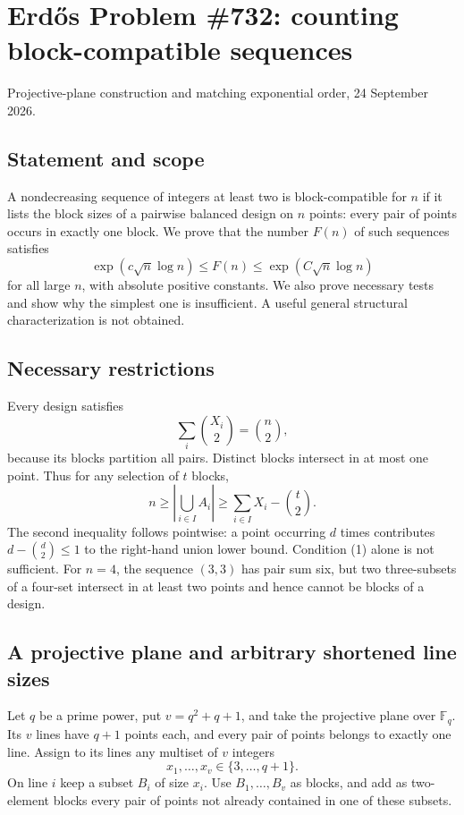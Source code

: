 \section{Erd\H{o}s Problem \#732: counting block-compatible sequences}
\noindent Projective-plane construction and matching exponential order, 24 September 2026.

\subsection*{Statement and scope}
A nondecreasing sequence of integers at least two is block-compatible for $n$ if it lists the block sizes of a pairwise balanced design on $n$ points: every pair of points occurs in exactly one block. We prove that the number $F(n)$ of such sequences satisfies
\[
 \exp(c\sqrt n\log n)\leq F(n)\leq\exp(C\sqrt n\log n)
\]
for all large $n$, with absolute positive constants. We also prove necessary tests and show why the simplest one is insufficient. A useful general structural characterization is not obtained.

\subsection*{Necessary restrictions}
Every design satisfies
\[
 \sum_i\binom{X_i}{2}=\binom n2, \tag{1}
\]
because its blocks partition all pairs. Distinct blocks intersect in at most one point. Thus for any selection of $t$ blocks,
\[
 n\geq\left|\bigcup_{i\in I}A_i\right|
 \geq\sum_{i\in I}X_i-\binom t2. \tag{2}
\]
The second inequality follows pointwise: a point occurring $d$ times contributes $d-\binom d2\leq1$ to the right-hand union lower bound.
Condition (1) alone is not sufficient. For $n=4$, the sequence $(3,3)$ has pair sum six, but two three-subsets of a four-set intersect in at least two points and hence cannot be blocks of a design.

\subsection*{A projective plane and arbitrary shortened line sizes}
Let $q$ be a prime power, put $v=q^2+q+1$, and take the projective plane over $\mathbb F_q$. Its $v$ lines have $q+1$ points each, and every pair of points belongs to exactly one line.
Assign to its lines any multiset of $v$ integers
\[
 x_1,\ldots,x_v\in\{3,\ldots,q+1\}.
\]
On line $i$ keep a subset $B_i$ of size $x_i$. Use $B_1,\ldots,B_v$ as blocks, and add as two-element blocks every pair of points not already contained in one of these subsets.


